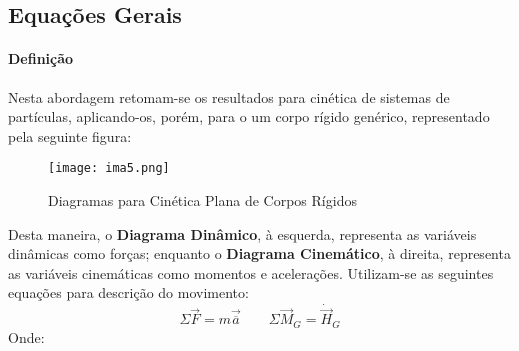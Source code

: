 \documentclass{article}
\begin{document}
        \subsection{Equações Gerais}
            \paragraph{Definição}Nesta abordagem retomam-se os resultados para cinética de sistemas de partículas, aplicando-os, porém, para o um corpo rígido genérico, representado pela seguinte figura:
                \begin{figure}[H]
                    \centering
                    \texttt{[image: ima5.png]}
                    \caption{Diagramas para Cinética Plana de Corpos Rígidos}
                \end{figure}\noindent
            Desta maneira, o \textbf{Diagrama Dinâmico}, à esquerda,  representa as variáveis dinâmicas como forças; enquanto o \textbf{Diagrama Cinemático}, à direita, representa as variáveis cinemáticas como momentos e acelerações. Utilizam-se as seguintes equações para descrição do movimento:
                \begin{equation}
                    \boxed{
                        \Sigma\vec{F} = m\vec{\overline{a}}
                    }
                    \qquad
                    \boxed{
                        \Sigma\vec{M}_{G} = \dot{\vec{H}}_{G}
                    }
                \end{equation}
            Onde:
\end{document}
